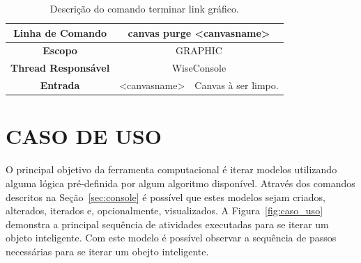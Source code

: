 \begin{center}
	\begin{table}[!htbp]
		\begin{tabularx}{\textwidth}{c|c|X}
			\toprule
			\textbf{Linha de Comando} & \multicolumn{2}{c}{canvas purge <canvas\underline{\space\space}name>} \\
			\midrule
			\textbf{Escopo} & \multicolumn{2}{c}{GRAPHIC} \\
			\hline
			\textbf{Thread Responsável} & \multicolumn{2}{c}{WiseConsole} \\
			\hline
			\textbf{Entrada} & <canvas\underline{\space\space}name> & Canvas à ser limpo. \\
			\bottomrule
		\end{tabularx}
		\caption{Descrição do comando terminar link gráfico.}
		\label{tab:graphic_purge}
	\end{table}
\end{center}

\section{CASO DE USO}\label{sec:caso_de_uso}

O principal objetivo da ferramenta computacional é iterar modelos utilizando alguma lógica pré-definida por algum algoritmo disponível. Através dos comandos descritos na Seção~\ref{sec:console} é possível que estes modelos sejam criados, alterados, iterados e, opcionalmente, visualizados. A Figura~\ref{fig:caso_uso} demonstra a principal sequência de atividades executadas para se iterar um objeto inteligente. Com este modelo é possível observar a sequência de passos necessárias para se iterar um obejto inteligente.

